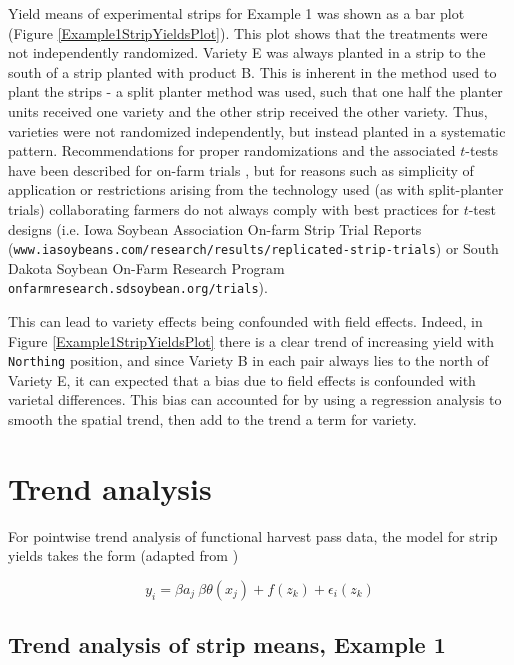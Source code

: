\documentclass[phdcss]{SDSUThesis}
\begin{document}
Yield means of experimental strips for Example 1 was shown as a bar plot (Figure \ref{Example1StripYieldsPlot}). This plot shows that the treatments were not independently randomized. Variety E was always planted in a strip to the south of a strip planted with product B. This is inherent in the method used to plant the strips - a split planter method was used, such that one half the planter units received one variety and the other strip received the other variety. Thus, varieties were not randomized independently, but instead planted in a systematic pattern. Recommendations for proper randomizations and the associated $t$-tests have been described for on-farm trials \cite{brimley-08-2006, hall-2006, kyveryga-06-2018}, but for reasons such as simplicity of application or restrictions arising from the technology used (as with split-planter trials) collaborating farmers do not always comply with best practices for $t$-test designs (i.e. Iowa Soybean Association On-farm Strip Trial Reports (\texttt{www.iasoybeans.com/research/results/replicated-strip-trials}) or South Dakota Soybean On-Farm Research Program \texttt{onfarmresearch.sdsoybean.org/trials}).

This can lead to variety effects being confounded with field effects. Indeed, in Figure \ref{Example1StripYieldsPlot} there is a clear trend of increasing yield with \texttt{Northing} position, and since Variety B in each pair always lies to the north of Variety E, it can expected that a bias due to field effects is confounded with varietal differences. This bias can accounted for by using a regression analysis to smooth the spatial trend, then add to the trend a term for variety. 

\clearpage

\section{Trend analysis}

For pointwise trend analysis of functional harvest pass data, the model for strip yields takes the form (adapted from \cite{hastie-1996, wood-2017})

\begin{equation}\label{UnivariateGAM}
y_i = \beta a_j\ \beta \theta(x_j) + f(z_k) + \epsilon_i(z_k)
\end{equation}

\subsection{Trend analysis of strip means, Example 1}
\end{document}
